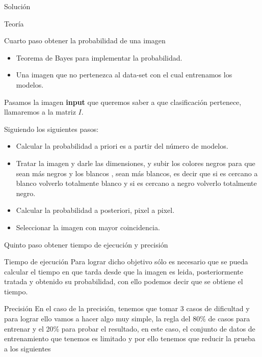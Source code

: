 \documentclass[
  spanish,
  ignorenonframetext,
]{beamer}
\providecommand{\tightlist}{%
  \setlength{\itemsep}{0pt}\setlength{\parskip}{0pt}}
\begin{document}
\begin{frame}[fragile]{Solución}
\begin{block}{Teoría}
\begin{block}{Cuarto paso obtener la probabilidad de una imagen}
\begin{itemize}
\tightlist
\item
  Teorema de Bayes para implementar la probabilidad.
\item
  Una imagen que no pertenezca al data-set con el cual entrenamos los
  modelos.
\end{itemize}

Pasamos la imagen \textbf{input} que queremos saber a que clasificación
pertenece, llamaremos a la matriz \(I\).

Siguiendo los siguientes pasos:

\begin{itemize}
\tightlist
\item
  Calcular la probabilidad a priori es a partir del número de modelos.
\item
  Tratar la imagen y darle las dimensiones, y subir los colores negros
  para que sean más negros y los blancos , sean más blancos, es decir
  que si es cercano a blanco volverlo totalmente blanco y si es cercano
  a negro volverlo totalmente negro.
\item
  Calcular la probabilidad a posteriori, pixel a pixel.
\item
  Seleccionar la imagen con mayor coincidencia.
\end{itemize}

\begin{block}{Quinto paso obtener tiempo de ejecución y precisión}
\protect\hypertarget{quinto-paso-obtener-tiempo-de-ejecuciuxf3n-y-precisiuxf3n}{}
\begin{block}{Tiempo de ejecución}
\protect\hypertarget{tiempo-de-ejecuciuxf3n}{}
Para lograr dicho objetivo sólo es necesario que se pueda calcular el
tiempo en que tarda desde que la imagen es leida, posteriormente tratada
y obtenido su probabilidad, con ello podemos decir que se obtiene el
tiempo.
\end{block}

\begin{block}{Precisión}
\protect\hypertarget{precisiuxf3n}{}
En el caso de la precisión, tenemos que tomar 3 casos de dificultad y
para lograr ello vamos a hacer algo muy simple, la regla del 80\% de
casos para entrenar y el 20\% para probar el resultado, en este caso, el
conjunto de datos de entrenamiento que tenemos es limitado y por ello
tenemos que reducir la prueba a los siguientes


\end{block}
\end{block}
\end{block}
\end{block}
\end{frame}
\end{document}
